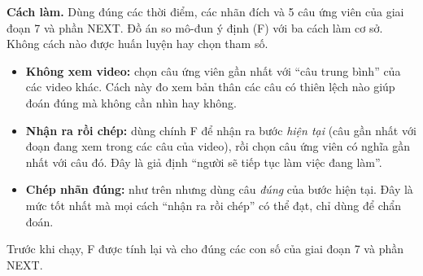 \documentclass[a4paper,oneside]{report}
\begin{document}
\textbf{Cách làm.} Dùng đúng các thời điểm, các nhãn đích và 5 câu ứng viên của giai đoạn 7 và phần NEXT. Đồ án so mô-đun ý định (F) với ba cách làm cơ sở. Không cách nào được huấn luyện hay chọn tham số.
\begin{itemize}
  \item \textbf{Không xem video:} chọn câu ứng viên gần nhất với ``câu trung bình'' của các video khác. Cách này đo xem bản thân các câu có thiên lệch nào giúp đoán đúng mà không cần nhìn hay không.
  \item \textbf{Nhận ra rồi chép:} dùng chính F để nhận ra bước \textit{hiện tại} (câu gần nhất với đoạn đang xem trong các câu của video), rồi chọn câu ứng viên có nghĩa gần nhất với câu đó. Đây là giả định ``người sẽ tiếp tục làm việc đang làm''.
  \item \textbf{Chép nhãn đúng:} như trên nhưng dùng câu \textit{đúng} của bước hiện tại. Đây là mức tốt nhất mà mọi cách ``nhận ra rồi chép'' có thể đạt, chỉ dùng để chẩn đoán.
\end{itemize}
Trước khi chạy, F được tính lại và cho đúng các con số của giai đoạn 7 và phần NEXT.

\begin{table}[ht]
\centering
\caption{Giai đoạn 8e: mô-đun ý định (F) so với các cách làm cơ sở, chọn đúng trong 5 câu cùng video (\%, đoán mò 20\%). Cột cuối: hiệu F trừ ``Nhận ra rồi chép'' [CI 95\%], ghép cặp trên cùng các thời điểm.}
\label{tab:baselines}
\end{table}
\end{document}
